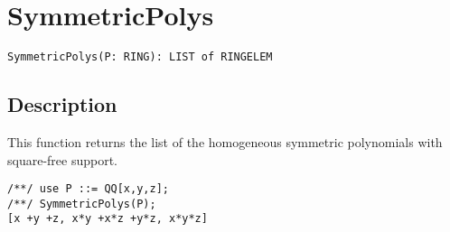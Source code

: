 \documentclass[a4paper]{mybook}
\newenvironment{command}{}{} %
\begin{document}
\section{SymmetricPolys}
\label{SymmetricPolys}
\begin{command} %


\begin{Verbatim}[label=syntax, rulecolor=\color{MidnightBlue},
frame=single]
SymmetricPolys(P: RING): LIST of RINGELEM
\end{Verbatim}


\subsection*{Description}

This function returns the list of the homogeneous symmetric
polynomials with square-free support.
\begin{Verbatim}[label=example, rulecolor=\color{PineGreen}, frame=single]
/**/ use P ::= QQ[x,y,z];
/**/ SymmetricPolys(P);
[x +y +z, x*y +x*z +y*z, x*y*z]
\end{Verbatim}


\end{command} %
\end{document}
